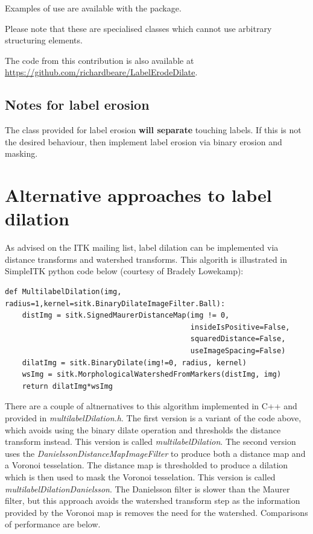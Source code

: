 \documentclass{InsightArticle}
\begin{document}
Examples of use are available with the package.

Please note that these are specialised classes which cannot use
arbitrary structuring elements.

The code from this contribution is also available at
\url{https://github.com/richardbeare/LabelErodeDilate}.

\subsection{Notes for label erosion}
The class provided for label erosion {\bf will separate} touching
labels. If this is not the desired behaviour, then implement label
erosion via binary erosion and masking.

\section{Alternative approaches to label dilation}
As advised on the ITK mailing list, label dilation can be implemented
via distance transforms and watershed transforms. This algorith is
illustrated in SimpleITK python code below (courtesy of Bradely
Lowekamp):

\lstset{language=Python}
\begin{lstlisting}
def MultilabelDilation(img, radius=1,kernel=sitk.BinaryDilateImageFilter.Ball):
    distImg = sitk.SignedMaurerDistanceMap(img != 0,
                                           insideIsPositive=False,
                                           squaredDistance=False,
                                           useImageSpacing=False)
    dilatImg = sitk.BinaryDilate(img!=0, radius, kernel)
    wsImg = sitk.MorphologicalWatershedFromMarkers(distImg, img)
    return dilatImg*wsImg
\end{lstlisting}

There are a couple of altnernatives to this algorithm implemented in
C++ and provided in {\em multilabelDilation.h}. The first version is a
variant of the code above, which avoids using the binary dilate
operation and thresholds the distance transform instead. This version
is called {\em multilabelDilation}. The second version uses the {\em
DanielssonDistanceMapImageFilter} to produce both a distance map and a
Voronoi tesselation. The distance map is thresholded to produce a
dilation which is then used to mask the Voronoi tesselation. This
version is called {\em multilabelDilationDanielsson}. The Danielsson
filter is slower than the Maurer filter, but this approach avoids the
watershed transform step as the information provided by the Voronoi
map is removes the need for the watershed. Comparisons of performance
are below.
\end{document}
